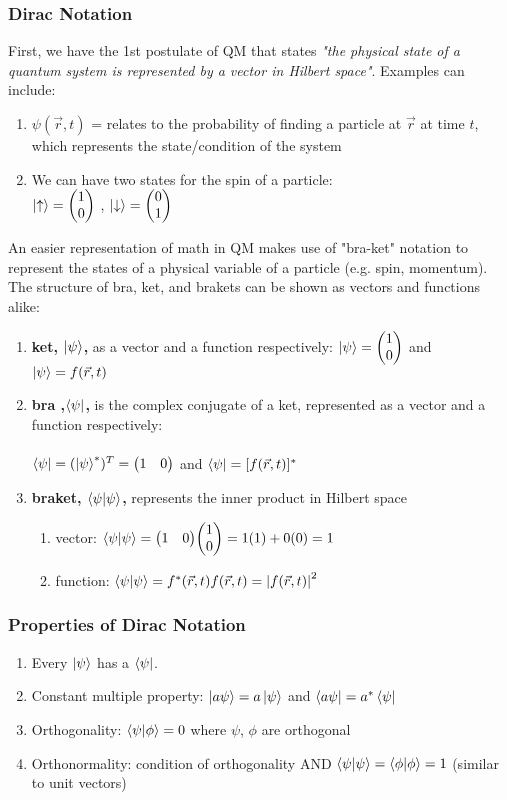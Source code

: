 \documentclass[]{article}
\begin{document}
\subsubsection{Dirac Notation}
First, we have the 1st postulate of QM that states \textit{"the physical state of a quantum system is represented by a vector in Hilbert space"}. Examples can include:
\begin{enumerate}
    \item $\psi(\vec{r},t)$ = relates to the probability of finding a particle at $\vec{r}$ at time $t$, which represents the state/condition of the system
    \item We can have two states for the spin of a particle:\\
    $\ket{\uparrow} = \mqty(1 \\ 0)$ , $\ket{\downarrow} = \mqty(0 \\ 1)$
\end{enumerate}
An easier representation of math in QM makes use of "bra-ket" notation to represent the states of a physical variable of a particle (e.g. spin, momentum).
The structure of bra, ket, and brakets can be shown as vectors and functions alike:
\begin{enumerate}
    \item \textbf{ket, $\ket{\psi}$,} as a vector and a function respectively: $\ket{\psi} = \mqty(1 \\ 0)$ and $\ket{\psi} = f(\vec{r},t)$
    \item \textbf{bra ,$\bra{\psi}$,} is the complex conjugate of a ket, represented as a vector and a function respectively:\\ \\$\bra{\psi} = (\ket{\psi}^*)^T = \mqty(1 & 0)$ and $\bra{\psi} = [f(\vec{r},t)]^*$
    \item \textbf{braket, $\braket{\psi}{\psi}$,} represents the inner product in Hilbert space
    \begin{enumerate}
        \item vector: $\braket{\psi}{\psi} = \mqty(1 & 0) \mqty(1 \\ 0) = 1(1)+0(0) = 1$
        \item function: $\braket{\psi}{\psi} = f^* (\vec{r},t) f(\vec{r},t) = \left|f(\vec{r},t)\right|^2$
    \end{enumerate}
\end{enumerate}

\subsubsection{Properties of Dirac Notation}
\begin{enumerate}
    \item Every $\ket{\psi}$ has a $\bra{\psi}$.
    \item Constant multiple property: $\ket{a\psi} = a\ket{\psi}$ and $\bra{a\psi} = a^*\bra{\psi}$
    \item Orthogonality: $\braket{\psi}{\phi}=0$ where $\psi$, $\phi$ are orthogonal
    \item Orthonormality: condition of orthogonality AND $\braket{\psi}{\psi}=\braket{\phi}{\phi}=1$ (similar to unit vectors)
\end{enumerate}
\end{document}
